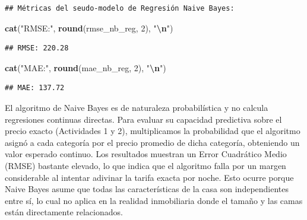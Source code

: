 \documentclass[
]{article}
\newenvironment{Shaded}{\begin{snugshade}}{\end{snugshade}}
\newcommand{\AttributeTok}[1]{\textcolor[rgb]{0.13,0.29,0.53}{#1}}
\newcommand{\CommentTok}[1]{\textcolor[rgb]{0.56,0.35,0.01}{\textit{#1}}}
\newcommand{\ConstantTok}[1]{\textcolor[rgb]{0.56,0.35,0.01}{#1}}
\newcommand{\DecValTok}[1]{\textcolor[rgb]{0.00,0.00,0.81}{#1}}
\newcommand{\FunctionTok}[1]{\textcolor[rgb]{0.13,0.29,0.53}{\textbf{#1}}}
\newcommand{\NormalTok}[1]{#1}
\newcommand{\OtherTok}[1]{\textcolor[rgb]{0.56,0.35,0.01}{#1}}
\newcommand{\SpecialCharTok}[1]{\textcolor[rgb]{0.81,0.36,0.00}{\textbf{#1}}}
\newcommand{\StringTok}[1]{\textcolor[rgb]{0.31,0.60,0.02}{#1}}
\begin{document}
\begin{Shaded}
\end{Shaded}

\begin{verbatim}
## Métricas del seudo-modelo de Regresión Naive Bayes:
\end{verbatim}

\begin{Shaded}
\begin{Highlighting}[]
\FunctionTok{cat}\NormalTok{(}\StringTok{"RMSE:"}\NormalTok{, }\FunctionTok{round}\NormalTok{(rmse\_nb\_reg, }\DecValTok{2}\NormalTok{), }\StringTok{"}\SpecialCharTok{\textbackslash{}n}\StringTok{"}\NormalTok{)}
\end{Highlighting}
\end{Shaded}

\begin{verbatim}
## RMSE: 220.28
\end{verbatim}

\begin{Shaded}
\begin{Highlighting}[]
\FunctionTok{cat}\NormalTok{(}\StringTok{"MAE:"}\NormalTok{, }\FunctionTok{round}\NormalTok{(mae\_nb\_reg, }\DecValTok{2}\NormalTok{), }\StringTok{"}\SpecialCharTok{\textbackslash{}n}\StringTok{"}\NormalTok{)}
\end{Highlighting}
\end{Shaded}

\begin{verbatim}
## MAE: 137.72
\end{verbatim}

El algoritmo de Naive Bayes es de naturaleza probabilística y no calcula
regresiones continuas directas. Para evaluar su capacidad predictiva
sobre el precio exacto (Actividades 1 y 2), multiplicamos la
probabilidad que el algoritmo asignó a cada categoría por el precio
promedio de dicha categoría, obteniendo un valor esperado continuo. Los
resultados muestran un Error Cuadrático Medio (RMSE) bastante elevado,
lo que indica que el algoritmo falla por un margen considerable al
intentar adivinar la tarifa exacta por noche. Esto ocurre porque Naive
Bayes asume que todas las características de la casa son independientes
entre sí, lo cual no aplica en la realidad inmobiliaria donde el tamaño
y las camas están directamente relacionados.
\end{document}
